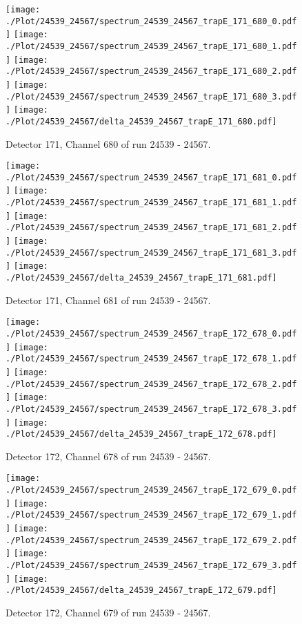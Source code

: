 \clearpage
\begin{figure}[hb]
\centering
\texttt{[image: ./Plot/24539\_24567/spectrum\_24539\_24567\_trapE\_171\_680\_0.pdf]}
\texttt{[image: ./Plot/24539\_24567/spectrum\_24539\_24567\_trapE\_171\_680\_1.pdf]}
\texttt{[image: ./Plot/24539\_24567/spectrum\_24539\_24567\_trapE\_171\_680\_2.pdf]}
\texttt{[image: ./Plot/24539\_24567/spectrum\_24539\_24567\_trapE\_171\_680\_3.pdf]}
\texttt{[image: ./Plot/24539\_24567/delta\_24539\_24567\_trapE\_171\_680.pdf]}
\caption{ Detector 171, Channel 680 of run 24539 - 24567.}
\label{fig:24539_24567_trapE_171_680}
\end{figure}
\clearpage
\begin{figure}[hb]
\centering
\texttt{[image: ./Plot/24539\_24567/spectrum\_24539\_24567\_trapE\_171\_681\_0.pdf]}
\texttt{[image: ./Plot/24539\_24567/spectrum\_24539\_24567\_trapE\_171\_681\_1.pdf]}
\texttt{[image: ./Plot/24539\_24567/spectrum\_24539\_24567\_trapE\_171\_681\_2.pdf]}
\texttt{[image: ./Plot/24539\_24567/spectrum\_24539\_24567\_trapE\_171\_681\_3.pdf]}
\texttt{[image: ./Plot/24539\_24567/delta\_24539\_24567\_trapE\_171\_681.pdf]}
\caption{ Detector 171, Channel 681 of run 24539 - 24567.}
\label{fig:24539_24567_trapE_171_681}
\end{figure}
\clearpage
\begin{figure}[hb]
\centering
\texttt{[image: ./Plot/24539\_24567/spectrum\_24539\_24567\_trapE\_172\_678\_0.pdf]}
\texttt{[image: ./Plot/24539\_24567/spectrum\_24539\_24567\_trapE\_172\_678\_1.pdf]}
\texttt{[image: ./Plot/24539\_24567/spectrum\_24539\_24567\_trapE\_172\_678\_2.pdf]}
\texttt{[image: ./Plot/24539\_24567/spectrum\_24539\_24567\_trapE\_172\_678\_3.pdf]}
\texttt{[image: ./Plot/24539\_24567/delta\_24539\_24567\_trapE\_172\_678.pdf]}
\caption{ Detector 172, Channel 678 of run 24539 - 24567.}
\label{fig:24539_24567_trapE_172_678}
\end{figure}
\clearpage
\begin{figure}[hb]
\centering
\texttt{[image: ./Plot/24539\_24567/spectrum\_24539\_24567\_trapE\_172\_679\_0.pdf]}
\texttt{[image: ./Plot/24539\_24567/spectrum\_24539\_24567\_trapE\_172\_679\_1.pdf]}
\texttt{[image: ./Plot/24539\_24567/spectrum\_24539\_24567\_trapE\_172\_679\_2.pdf]}
\texttt{[image: ./Plot/24539\_24567/spectrum\_24539\_24567\_trapE\_172\_679\_3.pdf]}
\texttt{[image: ./Plot/24539\_24567/delta\_24539\_24567\_trapE\_172\_679.pdf]}
\caption{ Detector 172, Channel 679 of run 24539 - 24567.}
\label{fig:24539_24567_trapE_172_679}
\end{figure}
